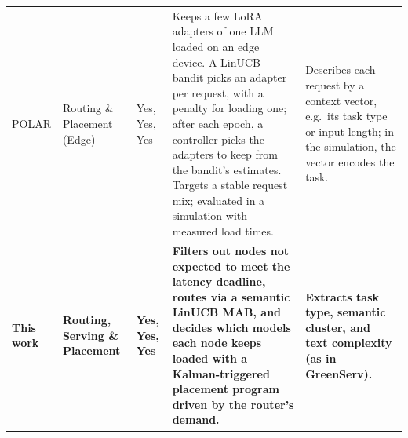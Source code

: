 \begin{landscape}
\begin{xltabular}{\linewidth}{p{1.75cm} p{1.55cm} p{1.3cm} X X}
POLAR \cite{polar} & Routing \newline \& Placement \newline (Edge) & Yes, Yes, Yes & Keeps a few LoRA adapters of one LLM loaded on an edge device. A LinUCB bandit picks an adapter per request, with a penalty for loading one; after each epoch, a controller picks the adapters to keep from the bandit's estimates. Targets a stable request mix; evaluated in a simulation with measured load times. & Describes each request by a context vector, e.g.\ its task type or input length; in the simulation, the vector encodes the task. \\

\textbf{This work} & \textbf{Routing, Serving \& Placement} & \textbf{Yes, Yes, Yes} & \textbf{Filters out nodes not expected to meet the latency deadline, routes via a semantic LinUCB MAB, and decides which models each node keeps loaded with a Kalman-triggered placement program driven by the router's demand.} & \textbf{Extracts task type, semantic cluster, and text complexity (as in GreenServ).} \\
\end{xltabular}
\end{landscape}